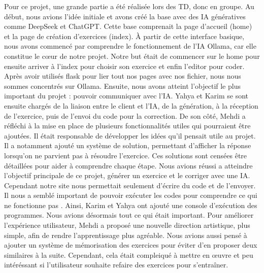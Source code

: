 \documentclass[a4paper, 12pt, twoside]{article}
\begin{document}
Pour ce projet, une grande partie a été réalisée lors des TD, donc en groupe. Au début, nous avions l’idée initiale et avons créé la base avec des IA génératives comme DeepSeek et ChatGPT. Cette base comprenait la page d’accueil (home) et la page de création d'exercices (index). À partir de cette interface basique, nous avons commencé par comprendre le fonctionnement de l’IA Ollama, car elle constitue le cœur de notre projet. Notre but était de commencer sur le home pour ensuite arriver à l’index pour choisir son exercice et enfin l’editor pour coder. Après avoir utilisés flask pour lier tout nos pages avec nos fichier, nous nous sommes concentrés sur Ollama.
Ensuite, nous avons atteint l’objectif le plus important du projet : pouvoir communiquer avec l’IA. Yahya et Karim se sont ensuite chargés de la liaison entre le client et l’IA, de la génération, à la réception de l’exercice, puis de l’envoi du code pour la correction. De son côté, Mehdi a réfléchi à la mise en place de plusieurs fonctionnalités utiles qui pourraient être ajoutées. Il était responsable de développer les idées qu’il pensait utile au projet.
Il a notamment ajouté un système de solution, permettant d’afficher la réponse lorsqu’on ne parvient pas à résoudre l’exercice. Ces solutions sont censées être détaillées pour aider à comprendre chaque étape.
Nous avions réussi a atteindre l’objectif principale de ce projet, générer un exercice et le corriger avec une IA. Cependant notre site nous permettait seulement d’écrire du code et de l’envoyer. Il nous a semblé important de pouvoir exécuter les codes pour comprendre ce qui ne fonctionne pas . Ainsi, Karim et Yahya ont ajouté une console d’exécution des programmes.
Nous avions désormais tout ce qui était important. Pour améliorer l’expérience utilisateur, Mehdi a proposé une nouvelle direction artistique, plus simple, afin de rendre l’apprentissage plus agréable.
Nous avions aussi pensé à ajouter un système de mémorisation des exercices pour éviter d’en proposer deux similaires à la suite. Cependant, cela était compleiqué à mettre en œuvre et peu intéréssant si l’utilisateur souhaite refaire des exercices pour s’entraîner.
\end{document}
